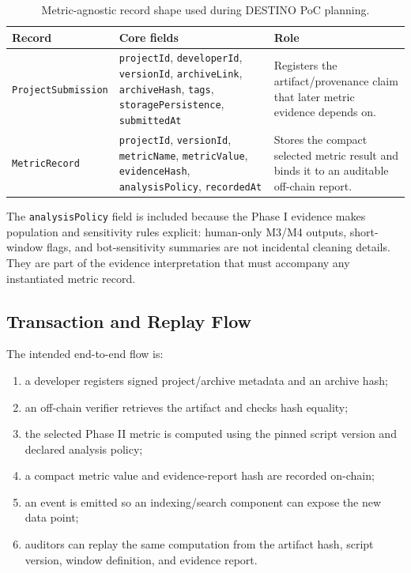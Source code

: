 \begin{table}[H]
\centering
\footnotesize
\renewcommand{\arraystretch}{1.15}
\begin{tabularx}{\textwidth}{p{3.2cm}X X}
\toprule
\textbf{Record} & \textbf{Core fields} & \textbf{Role} \\
\midrule
\texttt{ProjectSubmission} &
\texttt{projectId}, \texttt{developerId}, \texttt{versionId}, \texttt{archiveLink}, \texttt{archiveHash},
\texttt{tags}, \texttt{storagePersistence}, \texttt{submittedAt} &
Registers the artifact/provenance claim that later metric evidence depends on. \\
\texttt{MetricRecord} &
\texttt{projectId}, \texttt{versionId}, \texttt{metricName}, \texttt{metricValue}, \texttt{evidenceHash},
\texttt{analysisPolicy}, \texttt{recordedAt} &
Stores the compact selected metric result and binds it to an auditable off-chain report. \\
\bottomrule
\end{tabularx}
\caption{Metric-agnostic record shape used during DESTINO PoC planning.}
\label{tab:destino_record_shape}
\end{table}

The \texttt{analysisPolicy} field is included because the Phase I evidence makes population and sensitivity rules explicit:
human-only M3/M4 outputs, short-window flags, and bot-sensitivity summaries are not incidental cleaning details. They are part
of the evidence interpretation that must accompany any instantiated metric record.

\subsection{Transaction and Replay Flow}
\label{sec:design_tx_flow}

The intended end-to-end flow is:
\begin{enumerate}[leftmargin=*]
  \item a developer registers signed project/archive metadata and an archive hash;
  \item an off-chain verifier retrieves the artifact and checks hash equality;
  \item the selected Phase II metric is computed using the pinned script version and declared analysis policy;
  \item a compact metric value and evidence-report hash are recorded on-chain;
  \item an event is emitted so an indexing/search component can expose the new data point;
  \item auditors can replay the same computation from the artifact hash, script version, window definition, and evidence report.
\end{enumerate}

